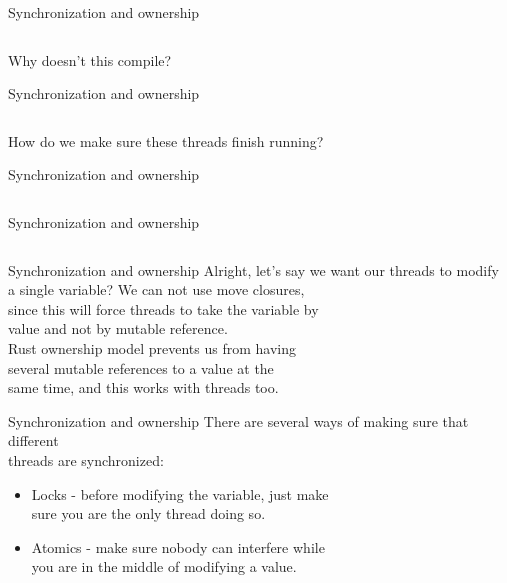 \documentclass[usenames,dvipsnames,10pt,aspectratio=169]{beamer}
\begin{document}
\begin{frame}{Synchronization and ownership}
	\inputminted[fontsize=\footnotesize]{rust}{code/sync1.rs}
	\vspace{0.3cm}
	Why doesn't this compile?
\end{frame}

\begin{frame}{Synchronization and ownership}
	\inputminted[fontsize=\footnotesize]{rust}{code/sync2.rs}
	\vspace{0.3cm}
	How do we make sure these threads finish running?
\end{frame}

\begin{frame}{Synchronization and ownership}
	\inputminted[fontsize=\scriptsize]{rust}{code/sync3.rs}
	\vspace{0.3cm}
\end{frame}

\begin{frame}{Synchronization and ownership}
	\inputminted[fontsize=\scriptsize]{rust}{code/sync4.rs}
	\vspace{0.3cm}
\end{frame}

\begin{frame}{Synchronization and ownership}
	Alright, let's say we want our threads to modify\\
	a single variable? We can not use \textcolor{ucuyellow}{move} closures,\\
	since this will force threads to take the variable by\\
	value and not by mutable reference.\\
	\vspace{0.3cm}
	Rust ownership model prevents us from having\\
	several mutable references to a value at the\\
	same time, and this works with threads too.
\end{frame}

\begin{frame}{Synchronization and ownership}
	There are several ways of making sure that different\\
	threads are synchronized:

	\vspace{0.3cm}
	\begin{itemize}[label=$\bullet$]
		\item \textcolor{ucuyellow}{Locks} - before modifying the variable, just make\\
			sure you are the only thread doing so.
		\item \textcolor{ucuyellow}{Atomics} - make sure nobody can interfere while\\
			you are in the middle of modifying a value.
	\end{itemize}
\end{frame}
\end{document}
